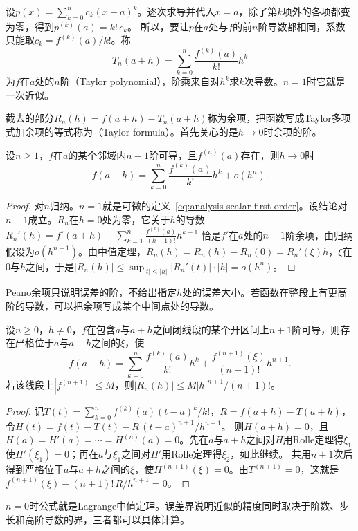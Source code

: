 设$p(x)=\sum_{k=0}^nc_k(x-a)^k$。逐次求导并代入$x=a$，除了第$k$项外的各项都变为零，得到$p^{(k)}(a)=k!\,c_k$。
所以，要让$p$在$a$处与$f$的前$n$阶导数都相同，系数只能取$c_k=f^{(k)}(a)/k!$。称
\[
 T_n(a+h)=\sum_{k=0}^n\frac{f^{(k)}(a)}{k!}h^k
\]
为$f$在$a$处的$n$阶（Taylor polynomial），阶乘来自对$h^k$求$k$次导数。$n=1$时它就是一次近似。

截去的部分$R_n(h)=f(a+h)-T_n(a+h)$称为余项，把函数写成Taylor多项式加余项的等式称为（Taylor formula）。首先关心的是$h\to0$时余项的阶。
\begin{theorem}[带Peano余项的Taylor公式]
\label{thm:ru-taylor-peano}
设$n\geq1$，$f$在$a$的某个邻域内$n-1$阶可导，且$f^{(n)}(a)$存在，则$h\to0$时
\[
 f(a+h)=\sum_{k=0}^n\frac{f^{(k)}(a)}{k!}h^k+o(h^n).
\]
\end{theorem}
\begin{proof}
对$n$归纳。$n=1$就是可微的定义~\eqref{eq:analysis-scalar-first-order}。设结论对$n-1$成立。$R_n$在$h=0$处为零，它关于$h$的导数$R_n'(h)=f'(a+h)-\sum_{k=1}^n\frac{f^{(k)}(a)}{(k-1)!}h^{k-1}$
恰是$f'$在$a$处的$n-1$阶余项，由归纳假设为$o(h^{n-1})$。由中值定理，$R_n(h)=R_n(h)-R_n(0)=R_n'(\xi)h$，$\xi$在$0$与$h$之间，于是$|R_n(h)|\leq\sup_{|t|\leq|h|}|R_n'(t)|\cdot|h|=o(h^n)$。
\end{proof}
Peano余项只说明误差的阶，不给出指定$h$处的误差大小。若函数在整段上有更高阶的导数，可以把余项写成某个中间点处的导数。
\begin{theorem}[带Lagrange余项的Taylor公式]
\label{thm:analysis-taylor-lagrange}
设$n\geq0$，$h\neq0$，$f$在包含$a$与$a+h$之间闭线段的某个开区间上$n+1$阶可导，则存在严格位于$a$与$a+h$之间的$\xi$，使
\begin{equation}
 f(a+h)=\sum_{k=0}^n\frac{f^{(k)}(a)}{k!}h^k+\frac{f^{(n+1)}(\xi)}{(n+1)!}h^{n+1}.
 \label{eq:analysis-taylor-arbitrary-order}
\end{equation}
若该线段上$|f^{(n+1)}|\leq M$，则$|R_n(h)|\leq M|h|^{n+1}/(n+1)!$。
\end{theorem}
\begin{proof}
记$T(t)=\sum_{k=0}^nf^{(k)}(a)(t-a)^k/k!$，$R=f(a+h)-T(a+h)$，令$H(t)=f(t)-T(t)-R\,(t-a)^{n+1}/h^{n+1}$。
则$H(a+h)=0$，且$H(a)=H'(a)=\cdots=H^{(n)}(a)=0$。先在$a$与$a+h$之间对$H$用Rolle定理得$\xi_1$使$H'(\xi_1)=0$；再在$a$与$\xi_1$之间对$H'$用Rolle定理得$\xi_2$，如此继续。
共用$n+1$次后得到严格位于$a$与$a+h$之间的$\xi$，使$H^{(n+1)}(\xi)=0$。由$T^{(n+1)}=0$，这就是$f^{(n+1)}(\xi)-(n+1)!\,R/h^{n+1}=0$。
\end{proof}
$n=0$时公式就是Lagrange中值定理。误差界说明近似的精度同时取决于阶数、步长和高阶导数的界，三者都可以具体计算。

